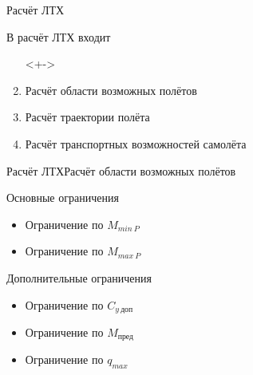 \begin{frame}{Расчёт ЛТХ}
\begin{block}{В расчёт ЛТХ входит}
   \begin{enumerate}
    \item [] <+->
    \item <+-> Расчёт области возможных полётов
    \item <+-> Расчёт траектории полёта 
    \item <+-> Расчёт транспортных возможностей самолёта
   \end{enumerate}
\end{block}
\end{frame}

\begin{frame}{Расчёт ЛТХ}{Расчёт области возможных полётов}

    \begin{block}{Основные ограничения}
        \begin{itemize}
            \item Ограничение по $M_{min \ P}$ 
            \item Ограничение по $M_{max \ P}$
        \end{itemize}
    \end{block}

    \begin{block}{Дополнительные ограничения}
        \begin{itemize}
            \item Ограничение по $C_{y \ \text{доп}}$
            \item Ограничение по $M_\text{пред}$
            \item Ограничение по $q_{max}$
        \end{itemize}
    \end{block}

\end{frame}

